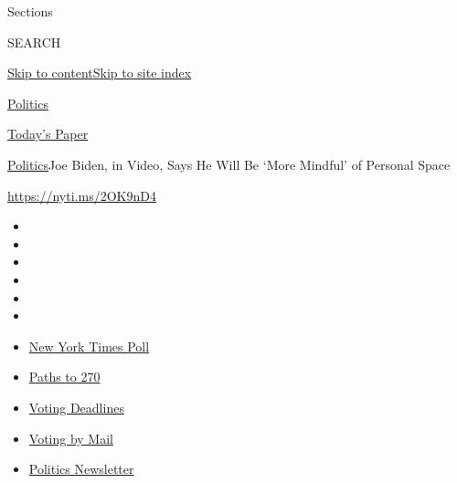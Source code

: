 Sections

SEARCH

\protect\hyperlink{site-content}{Skip to
content}\protect\hyperlink{site-index}{Skip to site index}

\href{https://www.nytimes3xbfgragh.onion/section/politics}{Politics}

\href{https://myaccount.nytimes3xbfgragh.onion/auth/login?response_type=cookie\&client_id=vi}{}

\href{https://www.nytimes3xbfgragh.onion/section/todayspaper}{Today's
Paper}

\href{/section/politics}{Politics}\textbar{}Joe Biden, in Video, Says He
Will Be `More Mindful' of Personal Space

\url{https://nyti.ms/2OK9nD4}

\begin{itemize}
\item
\item
\item
\item
\item
\item
\end{itemize}

\begin{itemize}
\item
  \href{https://www.nytimes3xbfgragh.onion/2020/09/12/us/politics/biden-trump-poll-wisconsin-minnesota.html?action=click\&pgtype=Article\&state=default\&region=TOP_BANNER\&context=storylines_menu}{New
  York Times Poll}
\item
  \href{https://www.nytimes3xbfgragh.onion/interactive/2020/us/elections/election-states-biden-trump.html?action=click\&pgtype=Article\&state=default\&region=TOP_BANNER\&context=storylines_menu}{Paths
  to 270}
\item
  \href{https://www.nytimes3xbfgragh.onion/interactive/2019/us/elections/2020-presidential-election-calendar.html?action=click\&pgtype=Article\&state=default\&region=TOP_BANNER\&context=storylines_menu}{Voting
  Deadlines}
\item
  \href{https://www.nytimes3xbfgragh.onion/interactive/2020/08/31/us/politics/vote-by-mail-deadlines.html?action=click\&pgtype=Article\&state=default\&region=TOP_BANNER\&context=storylines_menu}{Voting
  by Mail}
\item
  \href{https://www.nytimes3xbfgragh.onion/newsletters/politics?action=click\&pgtype=Article\&state=default\&region=TOP_BANNER\&context=storylines_menu}{Politics
  Newsletter}
\end{itemize}

